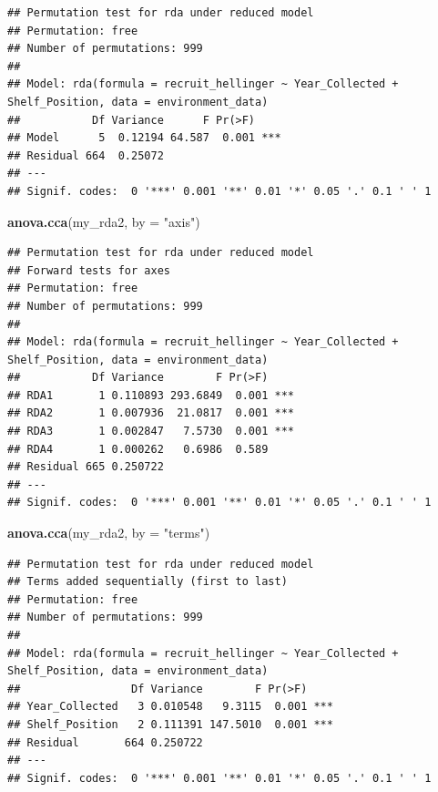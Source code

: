 \documentclass[
]{article}
\newenvironment{Shaded}{\begin{snugshade}}{\end{snugshade}}
\newcommand{\AttributeTok}[1]{\textcolor[rgb]{0.13,0.29,0.53}{#1}}
\newcommand{\FunctionTok}[1]{\textcolor[rgb]{0.13,0.29,0.53}{\textbf{#1}}}
\newcommand{\NormalTok}[1]{#1}
\newcommand{\StringTok}[1]{\textcolor[rgb]{0.31,0.60,0.02}{#1}}
\begin{document}
\begin{verbatim}
## Permutation test for rda under reduced model
## Permutation: free
## Number of permutations: 999
## 
## Model: rda(formula = recruit_hellinger ~ Year_Collected + Shelf_Position, data = environment_data)
##           Df Variance      F Pr(>F)    
## Model      5  0.12194 64.587  0.001 ***
## Residual 664  0.25072                  
## ---
## Signif. codes:  0 '***' 0.001 '**' 0.01 '*' 0.05 '.' 0.1 ' ' 1
\end{verbatim}

\begin{Shaded}
\begin{Highlighting}[]
\FunctionTok{anova.cca}\NormalTok{(my\_rda2, }\AttributeTok{by =} \StringTok{"axis"}\NormalTok{)}
\end{Highlighting}
\end{Shaded}

\begin{verbatim}
## Permutation test for rda under reduced model
## Forward tests for axes
## Permutation: free
## Number of permutations: 999
## 
## Model: rda(formula = recruit_hellinger ~ Year_Collected + Shelf_Position, data = environment_data)
##           Df Variance        F Pr(>F)    
## RDA1       1 0.110893 293.6849  0.001 ***
## RDA2       1 0.007936  21.0817  0.001 ***
## RDA3       1 0.002847   7.5730  0.001 ***
## RDA4       1 0.000262   0.6986  0.589    
## Residual 665 0.250722                    
## ---
## Signif. codes:  0 '***' 0.001 '**' 0.01 '*' 0.05 '.' 0.1 ' ' 1
\end{verbatim}

\begin{Shaded}
\begin{Highlighting}[]
\FunctionTok{anova.cca}\NormalTok{(my\_rda2, }\AttributeTok{by =} \StringTok{"terms"}\NormalTok{)}
\end{Highlighting}
\end{Shaded}

\begin{verbatim}
## Permutation test for rda under reduced model
## Terms added sequentially (first to last)
## Permutation: free
## Number of permutations: 999
## 
## Model: rda(formula = recruit_hellinger ~ Year_Collected + Shelf_Position, data = environment_data)
##                 Df Variance        F Pr(>F)    
## Year_Collected   3 0.010548   9.3115  0.001 ***
## Shelf_Position   2 0.111391 147.5010  0.001 ***
## Residual       664 0.250722                    
## ---
## Signif. codes:  0 '***' 0.001 '**' 0.01 '*' 0.05 '.' 0.1 ' ' 1
\end{verbatim}
\end{document}
